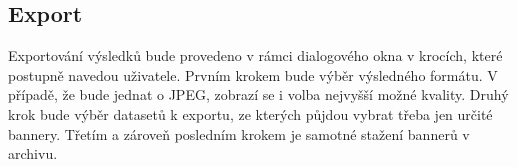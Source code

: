         \subsection{Export}
        Exportování výsledků bude provedeno v rámci dialogového okna v krocích, které postupně navedou uživatele.
        Prvním krokem bude výběr výsledného formátu. V případě, že bude jednat o JPEG, zobrazí se i volba nejvyšší možné kvality.
        Druhý krok bude výběr datasetů k exportu, ze kterých půjdou vybrat třeba jen určité bannery. Třetím a zároveň posledním krokem je
        samotné stažení bannerů v archivu. 

\endinput